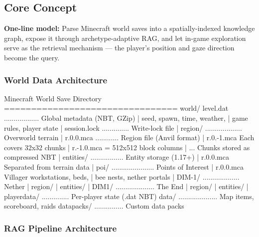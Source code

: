 \documentclass[11pt,letterpaper]{article}
\begin{document}
\subsection{Core Concept}

\begin{quotebox}
\textbf{One-line model:} Parse Minecraft world saves into a spatially-indexed knowledge graph, expose it through archetype-adaptive RAG, and let in-game exploration serve as the retrieval mechanism --- the player's position and gaze direction become the query.
\end{quotebox}

\subsubsection{World Data Architecture}

\begin{asciibox}
Minecraft World Save Directory
================================
world/
  level.dat .................. Global metadata (NBT, GZip)
  |                            seed, spawn, time, weather,
  |                            game rules, player state
  |
  session.lock .............. Write-lock file
  |
  region/ ................... Overworld terrain
  |   r.0.0.mca ............ Region file (Anvil format)
  |   r.0.-1.mca              Each covers 32x32 chunks
  |   r.-1.0.mca              = 512x512 block columns
  |   ...                     Chunks stored as compressed NBT
  |
  entities/ ................. Entity storage (1.17+)
  |   r.0.0.mca               Separated from terrain data
  |
  poi/ ...................... Points of Interest
  |   r.0.0.mca               Villager workstations, beds,
  |                            bee nests, nether portals
  |
  DIM-1/ ................... Nether
  |   region/
  |   entities/
  |
  DIM1/ .................... The End
  |   region/
  |   entities/
  |
  playerdata/ .............. Per-player state (.dat NBT)
  data/ .................... Map items, scoreboard, raids
  datapacks/ ............... Custom data packs
\end{asciibox}

\subsubsection{RAG Pipeline Architecture}
\end{document}
